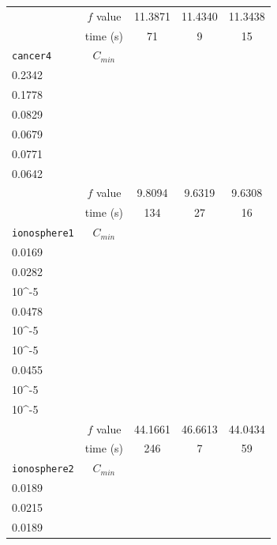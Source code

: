 \begin{table}[ht]
\begin{tabular}{|l|c|c|c|c|}
	& \(f\) value & 11.3871 & 11.4340 & 11.3438\\
	& time (s)& 71 & 9 & 15\\
	\hline
	\texttt{cancer4}& \(C_{min}\) & \(\begin{pmatrix}0.0476\\0.2342\\0.1778\end{pmatrix}\) & \(\begin{pmatrix}0.0219\\0.0829\\0.0679\end{pmatrix}\) & \(\begin{pmatrix}0.0202\\0.0771\\0.0642\end{pmatrix}\) \\
	& \(f\) value & 9.8094 & 9.6319 & 9.6308\\
	& time (s)& 134 & 27 & 16\\
	\hline
	\texttt{ionosphere1}& \(C_{min}\) & \(\begin{pmatrix}0.0078\\0.0169\\0.0282\\10^{-5}\end{pmatrix}\) & \(\begin{pmatrix}10^{-5}\\0.0478\\10^{-5}\\10^{-5}\end{pmatrix}\) & \(\begin{pmatrix}0.0074\\0.0455\\10^{-5}\\10^{-5}\end{pmatrix}\) \\
	& \(f\) value & 44.1661 & 46.6613 & 44.0434\\
	& time (s)& 246 & 7 & 59\\
	\hline
	\texttt{ionosphere2}& \(C_{min}\) & \(\begin{pmatrix}0.0116\\0.0189\end{pmatrix}\) & \(\begin{pmatrix}10^{-5}\\0.0215\end{pmatrix}\) & \(\begin{pmatrix}0.0116\\0.0189\end{pmatrix}\) \\

\end{tabular}
\end{table}
